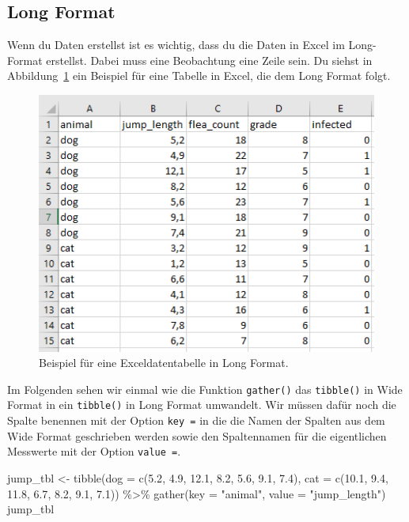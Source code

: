 \documentclass[
  letterpaper,
]{scrbook}
\newenvironment{Shaded}{\begin{snugshade}}{\end{snugshade}}
\newcommand{\AttributeTok}[1]{\textcolor[rgb]{0.40,0.45,0.13}{#1}}
\newcommand{\FloatTok}[1]{\textcolor[rgb]{0.68,0.00,0.00}{#1}}
\newcommand{\FunctionTok}[1]{\textcolor[rgb]{0.28,0.35,0.67}{#1}}
\newcommand{\NormalTok}[1]{\textcolor[rgb]{0.00,0.23,0.31}{#1}}
\newcommand{\OtherTok}[1]{\textcolor[rgb]{0.00,0.23,0.31}{#1}}
\newcommand{\SpecialCharTok}[1]{\textcolor[rgb]{0.37,0.37,0.37}{#1}}
\newcommand{\StringTok}[1]{\textcolor[rgb]{0.13,0.47,0.30}{#1}}
\begin{document}
\hypertarget{long-format}{%
\subsection{Long Format}\label{long-format}}

Wenn du Daten erstellst ist es wichtig, dass du die Daten in Excel im
Long-Format erstellst. Dabei muss eine Beobachtung eine Zeile sein. Du
siehst in Abbildung~\ref{fig-imp-long} ein Beispiel für eine Tabelle in
Excel, die dem Long Format folgt.

\begin{figure}

{\centering \includegraphics{./images/import_03.PNG}

}

\caption{\label{fig-imp-long}Beispiel für eine Exceldatentabelle in Long
Format.}

\end{figure}

Im Folgenden sehen wir einmal wie die Funktion \texttt{gather()} das
\texttt{tibble()} in Wide Format in ein \texttt{tibble()} in Long Format
umwandelt. Wir müssen dafür noch die Spalte benennen mit der Option
\texttt{key\ =} in die die Namen der Spalten aus dem Wide Format
geschrieben werden sowie den Spaltennamen für die eigentlichen Messwerte
mit der Option \texttt{value\ =}.

\begin{Shaded}
\begin{Highlighting}[]
\NormalTok{jump\_tbl }\OtherTok{\textless{}{-}} \FunctionTok{tibble}\NormalTok{(}\AttributeTok{dog =} \FunctionTok{c}\NormalTok{(}\FloatTok{5.2}\NormalTok{, }\FloatTok{4.9}\NormalTok{, }\FloatTok{12.1}\NormalTok{, }\FloatTok{8.2}\NormalTok{, }\FloatTok{5.6}\NormalTok{, }\FloatTok{9.1}\NormalTok{, }\FloatTok{7.4}\NormalTok{),}
                   \AttributeTok{cat =} \FunctionTok{c}\NormalTok{(}\FloatTok{10.1}\NormalTok{, }\FloatTok{9.4}\NormalTok{, }\FloatTok{11.8}\NormalTok{, }\FloatTok{6.7}\NormalTok{, }\FloatTok{8.2}\NormalTok{, }\FloatTok{9.1}\NormalTok{, }\FloatTok{7.1}\NormalTok{)) }\SpecialCharTok{\%\textgreater{}\%}
  \FunctionTok{gather}\NormalTok{(}\AttributeTok{key =} \StringTok{"animal"}\NormalTok{, }\AttributeTok{value =} \StringTok{"jump\_length"}\NormalTok{)}
\NormalTok{jump\_tbl}
\end{Highlighting}
\end{Shaded}
\end{document}
